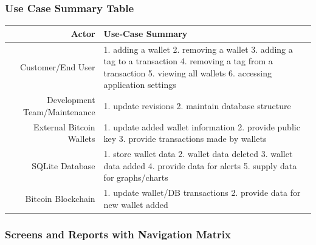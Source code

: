     \subsubsection{Use Case Summary Table}
	\begin{table}[H]
      \begin{tabularx}{\textwidth}{r | X}
        Actor                       & Use-Case Summary\\
        \hline
        Customer/End User            & 1. adding a wallet
									   2. removing a wallet
									   3. adding a tag to a transaction
									   4. removing a tag from a transaction
									   5. viewing all wallets
									   6. accessing application settings\\
        Development Team/Maintenance & 1. update revisions
									   2. maintain database structure\\
        External Bitcoin Wallets     & 1. update added wallet information
									   2. provide public key 
									   3. provide transactions made by wallets\\
        SQLite Database              & 1. store wallet data
									   2. wallet data deleted
									   3. wallet data added
									   4. provide data for alerts
									   5. supply data for graphs/charts\\
        Bitcoin Blockchain           & 1. update wallet/DB transactions
									   2. provide data for new wallet added\\
      \end{tabularx}
    \end{table}

    \subsubsection{Screens and Reports with Navigation Matrix}


